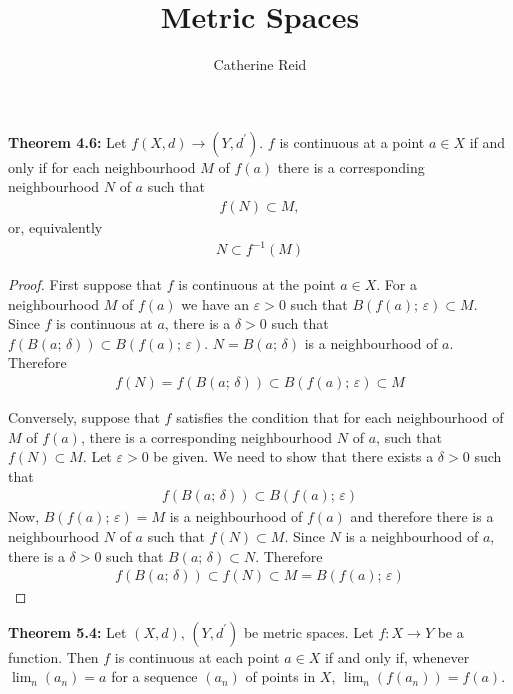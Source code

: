 \documentclass{article}
\author{Catherine Reid}
\title{Metric Spaces}
\begin{document}
\maketitle

\textbf{Theorem 4.6:} Let $f(X, d) \to (Y, d^\prime)$. $f$ is continuous at a point $a \in X$ if and only if for each neighbourhood $M$ of $f(a)$
there is a corresponding neighbourhood $N$ of $a$ such that
\begin{align*}
    f(N) \subset M,
\end{align*}
or, equivalently
\begin{align*}
    N \subset f^{-1}(M)
\end{align*}

\begin{proof}
    First suppose that $f$ is continuous at the point $a \in X$. For a neighbourhood $M$ of $f(a)$ we have an $\varepsilon > 0$ such
    that $B(f(a);\,\varepsilon) \subset M$. Since $f$ is continuous at $a$, there is a $\delta > 0$ such that $f(B(a;\,\delta)) \subset B(f(a);\,\varepsilon)$.
    $N = B(a;\,\delta)$ is a neighbourhood of $a$. Therefore
    \begin{align*}
        f(N) = f(B(a;\,\delta)) \subset B(f(a);\,\varepsilon) \subset M
    \end{align*}
    
    Conversely, suppose that $f$ satisfies the condition that for each neighbourhood of $M$ of $f(a)$, there is a corresponding neighbourhood
    $N$ of $a$, such that $f(N) \subset M$. Let $\varepsilon > 0$ be given. We need to show that there exists a $\delta > 0$ such that
    \begin{align*}
        f(B(a;\,\delta)) \subset B(f(a);\,\varepsilon)
    \end{align*}
    Now, $B(f(a);\,\varepsilon) = M$ is a neighbourhood of $f(a)$ and therefore there is a neighbourhood $N$ of $a$ such that $f(N) \subset M$.
    Since $N$ is a neighbourhood of $a$, there is a $\delta > 0$ such that $B(a;\,\delta) \subset N$. Therefore
    \begin{align*}
        f(B(a;\,\delta)) \subset f(N) \subset M = B(f(a);\,\varepsilon  )
    \end{align*}
\end{proof}
\pagebreak

\textbf{Theorem 5.4:} Let $(X, d),\,(Y, d^\prime)$ be metric spaces. Let $f: X \to Y$ be a function. Then $f$ is continuous at each point $a \in X$
if and only if, whenever $\lim_n(a_n) = a$ for a sequence $(a_n)$ of points in $X$, $\lim_n(f(a_n)) = f(a)$.
\end{document}

